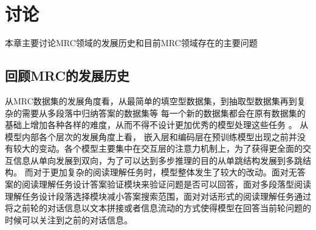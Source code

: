 \section{讨论}
本章主要讨论MRC领域的发展历史和目前MRC领域存在的主要问题
\subsection{回顾MRC的发展历史}
从MRC数据集的发展角度看，从最简单的填空型数据集，到抽取型数据集再到复杂的需要从多段落中归纳答案的数据集等
每一个新的数据集都会在原有数据集的基础上增加各种各样的难度，从而不得不设计更加优秀的模型处理这些任务
。
从模型内部各个层次的发展角度上看，
嵌入层和编码层在预训练模型出现之前并没有较大的变动。各个模型主要集中在交互层的注意力机制上，为了获得更全面的交互信息从单向发展到双向，为了可以达到多步推理的目的从单跳结构发展到多跳结构。
而对于更加复杂的阅读理解任务时，模型整体发生了较大的改动。面对无答案的阅读理解任务设计答案验证模块来验证问题是否可以回答，面对多段落型阅读理解任务设计段落选择模块减小答案搜索范围，面对对话形式的阅读理解任务通过将之前轮的对话信息以文本拼接或者信息流动的方式使得模型在回答当前轮问题的时候可以关注到之前的对话信息。


